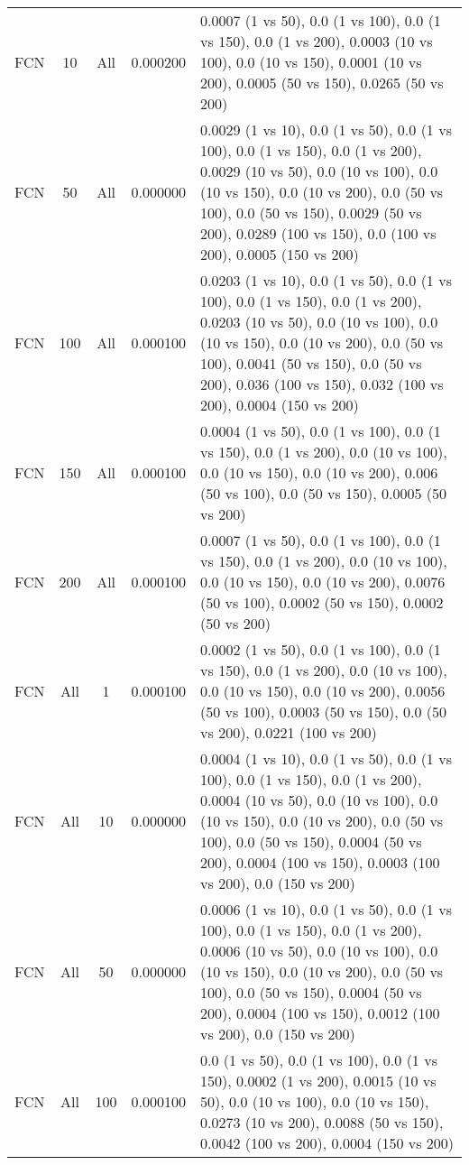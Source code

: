 \begin{tabular}{|l|c|c|c|p{7cm}|}
FCN & 10 & All & 0.000200 & 0.0007 (1 vs 50), 0.0 (1 vs 100), 0.0 (1 vs 150), 0.0 (1 vs 200), 0.0003 (10 vs 100), 0.0 (10 vs 150), 0.0001 (10 vs 200), 0.0005 (50 vs 150), 0.0265 (50 vs 200) \\
FCN & 50 & All & 0.000000 & 0.0029 (1 vs 10), 0.0 (1 vs 50), 0.0 (1 vs 100), 0.0 (1 vs 150), 0.0 (1 vs 200), 0.0029 (10 vs 50), 0.0 (10 vs 100), 0.0 (10 vs 150), 0.0 (10 vs 200), 0.0 (50 vs 100), 0.0 (50 vs 150), 0.0029 (50 vs 200), 0.0289 (100 vs 150), 0.0 (100 vs 200), 0.0005 (150 vs 200) \\
FCN & 100 & All & 0.000100 & 0.0203 (1 vs 10), 0.0 (1 vs 50), 0.0 (1 vs 100), 0.0 (1 vs 150), 0.0 (1 vs 200), 0.0203 (10 vs 50), 0.0 (10 vs 100), 0.0 (10 vs 150), 0.0 (10 vs 200), 0.0 (50 vs 100), 0.0041 (50 vs 150), 0.0 (50 vs 200), 0.036 (100 vs 150), 0.032 (100 vs 200), 0.0004 (150 vs 200) \\
FCN & 150 & All & 0.000100 & 0.0004 (1 vs 50), 0.0 (1 vs 100), 0.0 (1 vs 150), 0.0 (1 vs 200), 0.0 (10 vs 100), 0.0 (10 vs 150), 0.0 (10 vs 200), 0.006 (50 vs 100), 0.0 (50 vs 150), 0.0005 (50 vs 200) \\
FCN & 200 & All & 0.000100 & 0.0007 (1 vs 50), 0.0 (1 vs 100), 0.0 (1 vs 150), 0.0 (1 vs 200), 0.0 (10 vs 100), 0.0 (10 vs 150), 0.0 (10 vs 200), 0.0076 (50 vs 100), 0.0002 (50 vs 150), 0.0002 (50 vs 200) \\
FCN & All & 1 & 0.000100 & 0.0002 (1 vs 50), 0.0 (1 vs 100), 0.0 (1 vs 150), 0.0 (1 vs 200), 0.0 (10 vs 100), 0.0 (10 vs 150), 0.0 (10 vs 200), 0.0056 (50 vs 100), 0.0003 (50 vs 150), 0.0 (50 vs 200), 0.0221 (100 vs 200) \\
FCN & All & 10 & 0.000000 & 0.0004 (1 vs 10), 0.0 (1 vs 50), 0.0 (1 vs 100), 0.0 (1 vs 150), 0.0 (1 vs 200), 0.0004 (10 vs 50), 0.0 (10 vs 100), 0.0 (10 vs 150), 0.0 (10 vs 200), 0.0 (50 vs 100), 0.0 (50 vs 150), 0.0004 (50 vs 200), 0.0004 (100 vs 150), 0.0003 (100 vs 200), 0.0 (150 vs 200) \\
FCN & All & 50 & 0.000000 & 0.0006 (1 vs 10), 0.0 (1 vs 50), 0.0 (1 vs 100), 0.0 (1 vs 150), 0.0 (1 vs 200), 0.0006 (10 vs 50), 0.0 (10 vs 100), 0.0 (10 vs 150), 0.0 (10 vs 200), 0.0 (50 vs 100), 0.0 (50 vs 150), 0.0004 (50 vs 200), 0.0004 (100 vs 150), 0.0012 (100 vs 200), 0.0 (150 vs 200) \\
FCN & All & 100 & 0.000100 & 0.0 (1 vs 50), 0.0 (1 vs 100), 0.0 (1 vs 150), 0.0002 (1 vs 200), 0.0015 (10 vs 50), 0.0 (10 vs 100), 0.0 (10 vs 150), 0.0273 (10 vs 200), 0.0088 (50 vs 150), 0.0042 (100 vs 200), 0.0004 (150 vs 200) \\

\end{tabular}
